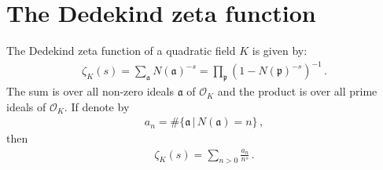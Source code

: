 \documentclass[reqno]{amsart}
\theoremstyle{plain}
\theoremstyle{definition}
\theoremstyle{remark}
\numberwithin{equation}{section}
\begin{document}
\bigskip

\section{The Dedekind zeta function}
\label{sec:dedekind_zeta}

The Dedekind zeta function of a quadratic field $K$ is given by:
\begin{align}
  \label{def:dedekind}
  \zeta_K(s) = \sum_{\mathfrak{a}}N(\mathfrak{a})^{-s}
  = \prod_{\mathfrak{p}}\left(1-N(\mathfrak{p})^{-s}\right)^{-1}\,.
\end{align}
The sum is over all non-zero ideals $\mathfrak{a}$ of ${{\mathcal O}}_K$ and
the product is over all prime ideals of ${{\mathcal O}}_K$. If denote by
\begin{align*}
  a_n = \#\{\mathfrak{a}\,\big|\, N(\mathfrak{a}) = n \}\,,
\end{align*}
then
\begin{align*}
  \zeta_K(s) = \sum_{n>0} \frac{a_n}{n^s}\,.
\end{align*}
\end{document}

